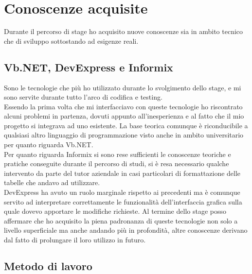 \section{Conoscenze acquisite}

Durante il percorso di stage ho acquisito nuove conoscenze sia in ambito tecnico che di sviluppo sottostando ad esigenze reali. 

\subsection{Vb.NET, DevExpress e Informix}

Sono le tecnologie che più ho utilizzato durante lo svolgimento dello stage, e mi sono servite durante tutto l'arco di codifica e testing.\\
Essendo la prima volta che mi interfacciavo con queste tecnologie ho riscontrato alcuni problemi in partenza, dovuti appunto all'inesperienza e al fatto che il mio 
progetto si integrava ad uno esistente. La base teorica comunque è riconducibile a qualsiasi altro linguaggio di programmazione visto anche in ambito universitario
per quanto riguarda Vb.NET. \\Per quanto riguarda Informix si sono rese sufficienti le conoscenze teoriche e pratiche conseguite durante il percorso di studi, si è resa
necessario qualche intervento da parte del tutor aziendale in casi particolari di formattazione delle tabelle che andavo ad utilizzare.\\
DevExpress ha avuto un ruolo marginale rispetto ai precedenti ma è comunque servito ad interpretare correttamente le funzionalità dell'interfaccia grafica sulla quale dovevo
apportare le modifiche richieste. Al termine dello stage posso affermare che ho acquisito la piena padronanza di queste tecnologie non solo a livello superficiale ma anche
andando più in profondità, altre conoscenze derivano dal fatto di prolungare il loro utilizzo in futuro.\\

\subsection{Metodo di lavoro}

